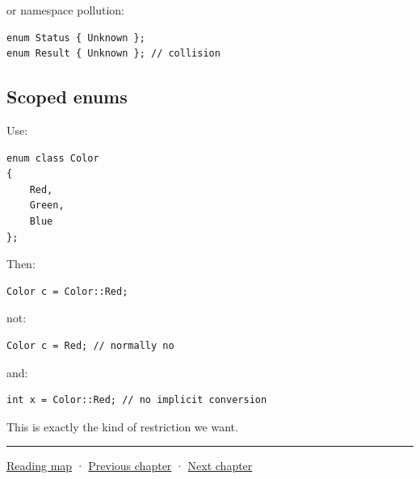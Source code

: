 or namespace pollution:

\begin{verbatim}
enum Status { Unknown };
enum Result { Unknown }; // collision
\end{verbatim}

\subsection{Scoped enums}\label{05-engine-i-ch002-scoped-enums}

\hypertarget{05-engine-i-ch002-scoped-enums}{}

Use:

\begin{verbatim}
enum class Color
{
    Red,
    Green,
    Blue
};
\end{verbatim}

Then:

\begin{verbatim}
Color c = Color::Red;
\end{verbatim}

not:

\begin{verbatim}
Color c = Red; // normally no
\end{verbatim}

and:

\begin{verbatim}
int x = Color::Red; // no implicit conversion
\end{verbatim}

This is exactly the kind of restriction we want.

\begin{center}\rule{0.5\linewidth}{0.5pt}\end{center}

\hyperref[volume-reading-map]{Reading map} · \hyperref[05-engine-i-ch001-a-game-promise-becomes-bytes-and-running-state]{Previous chapter} · \hyperref[05-engine-i-ch003-object-representation-lifetime-and-enforceable-promises]{Next chapter}
